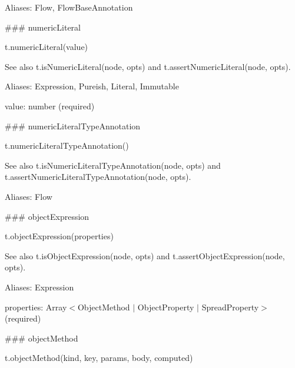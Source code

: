 Aliases\+: {\ttfamily Flow}, {\ttfamily Flow\+Base\+Annotation}





\#\#\# numeric\+Literal 
\begin{DoxyCode}
t.numericLiteral(value)
\end{DoxyCode}


See also {\ttfamily t.\+is\+Numeric\+Literal(node, opts)} and {\ttfamily t.\+assert\+Numeric\+Literal(node, opts)}.

Aliases\+: {\ttfamily Expression}, {\ttfamily Pureish}, {\ttfamily Literal}, {\ttfamily Immutable}


\begin{DoxyItemize}
\item {\ttfamily value}\+: {\ttfamily number} (required) 


\end{DoxyItemize}

\#\#\# numeric\+Literal\+Type\+Annotation 
\begin{DoxyCode}
t.numericLiteralTypeAnnotation()
\end{DoxyCode}


See also {\ttfamily t.\+is\+Numeric\+Literal\+Type\+Annotation(node, opts)} and {\ttfamily t.\+assert\+Numeric\+Literal\+Type\+Annotation(node, opts)}.

Aliases\+: {\ttfamily Flow}





\#\#\# object\+Expression 
\begin{DoxyCode}
t.objectExpression(properties)
\end{DoxyCode}


See also {\ttfamily t.\+is\+Object\+Expression(node, opts)} and {\ttfamily t.\+assert\+Object\+Expression(node, opts)}.

Aliases\+: {\ttfamily Expression}


\begin{DoxyItemize}
\item {\ttfamily properties}\+: {\ttfamily Array$<$Object\+Method $\vert$ Object\+Property $\vert$ Spread\+Property$>$} (required) 


\end{DoxyItemize}

\#\#\# object\+Method 
\begin{DoxyCode}
t.objectMethod(kind, key, params, body, computed)
\end{DoxyCode}


